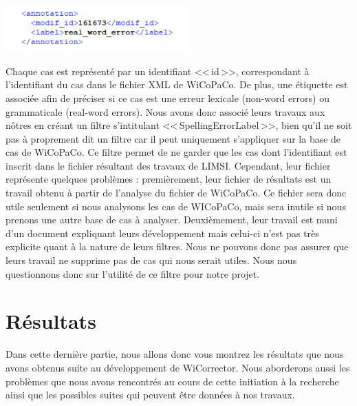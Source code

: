 \documentclass[11pt]{article}
\begin{document}
\begin{center}
\includegraphics[width=7cm]{exemple16.png} %
\end{center}

Chaque cas est repr\'{e}sent\'{e} par un identifiant <<\,id\,>>, correspondant \`{a} l'identifiant du cas dans le fichier XML de WiCoPaCo. De plus, une \'{e}tiquette est associ\'{e}e afin de pr\'{e}ciser si ce cas est une erreur lexicale (non-word errors) ou grammaticale (real-word errors). Nous avons donc associ\'{e} leurs travaux aux n\^{o}tres en cr\'{e}ant un filtre s'intitulant <<\,SpellingErrorLabel\,>>, bien qu'il ne soit pas \`{a} proprement dit un filtre car il peut uniquement s'appliquer sur la base de cas de WiCoPaCo. Ce filtre permet de ne garder que les cas dont l'identifiant est inscrit dans le fichier r\'{e}sultant des travaux de LIMSI.
\newline
\newline
Cependant, leur fichier repr\'{e}sente quelques probl\`{e}mes : premi\`{e}rement, leur fichier de r\'{e}sultats est un travail obtenu \`{a} partir de l'analyse du fichier de WiCoPaCo. Ce fichier sera donc utile seulement si nous analysons les cas de WICoPaCo, mais sera inutile si nous prenons une autre base de cas \`{a} analyser. Deuxi\`{e}mement, leur travail est muni d'un document expliquant leurs d\'{e}veloppement mais celui-ci n'est pas tr\`{e}s explicite quant \`{a} la nature de leurs filtres. Nous ne pouvons donc pas assurer que leurs travail ne supprime pas de cas qui nous serait utiles. Nous nous questionnons donc sur l'utilit\'{e} de ce filtre pour notre projet.
\newline
\newline

\section{R\'{e}sultats}

Dans cette derni\`{e}re partie, nous allons donc vous montrez les r\'{e}sultats que nous avons obtenus suite au d\'{e}veloppement de WiCorrector. Nous aborderons aussi les probl\`{e}mes que nous avons rencontr\'{e}s au cours de cette initiation \`{a} la recherche ainsi que les possibles suites qui peuvent \^{e}tre donn\'{e}es \`{a} nos travaux.
\end{document}
